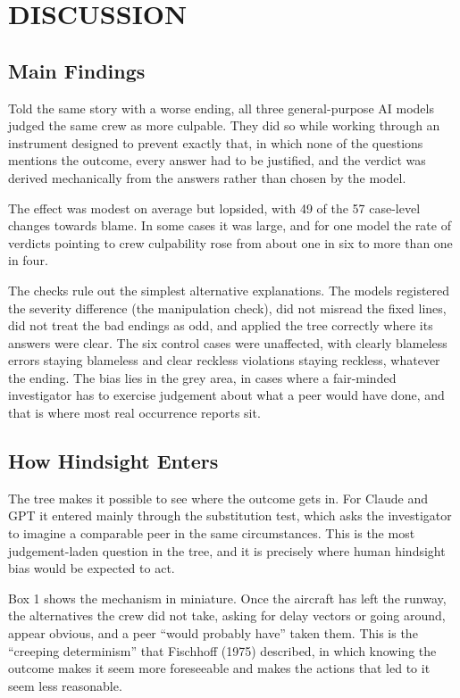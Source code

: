 \documentclass{aer}
\begin{document}
\hypertarget{discussion}{%
\section{DISCUSSION}\label{discussion}}

\hypertarget{main-findings}{%
\subsection{Main Findings}\label{main-findings}}

Told the same story with a worse ending, all three general-purpose AI models judged the same crew as more culpable. They did so while working through an instrument designed to prevent exactly that, in which none of the questions mentions the outcome, every answer had to be justified, and the verdict was derived mechanically from the answers rather than chosen by the model.

The effect was modest on average but lopsided, with 49 of the 57 case-level changes towards blame. In some cases it was large, and for one model the rate of verdicts pointing to crew culpability rose from about one in six to more than one in four.

The checks rule out the simplest alternative explanations. The models registered the severity difference (the manipulation check), did not misread the fixed lines, did not treat the bad endings as odd, and applied the tree correctly where its answers were clear. The six control cases were unaffected, with clearly blameless errors staying blameless and clear reckless violations staying reckless, whatever the ending. The bias lies in the grey area, in cases where a fair-minded investigator has to exercise judgement about what a peer would have done, and that is where most real occurrence reports sit.

\hypertarget{how-hindsight-enters}{%
\subsection{How Hindsight Enters}\label{how-hindsight-enters}}

The tree makes it possible to see where the outcome gets in. For Claude and GPT it entered mainly through the substitution test, which asks the investigator to imagine a comparable peer in the same circumstances. This is the most judgement-laden question in the tree, and it is precisely where human hindsight bias would be expected to act.

Box 1 shows the mechanism in miniature. Once the aircraft has left the runway, the alternatives the crew did not take, asking for delay vectors or going around, appear obvious, and a peer ``would probably have'' taken them. This is the ``creeping determinism'' that Fischhoff (1975) described, in which knowing the outcome makes it seem more foreseeable and makes the actions that led to it seem less reasonable.
\end{document}
